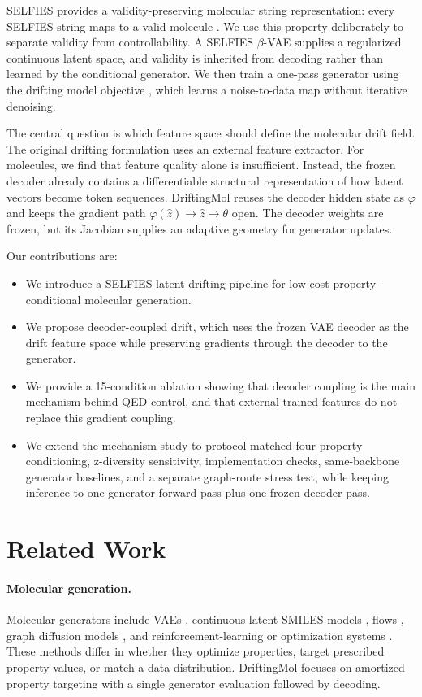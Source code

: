 \documentclass[letterpaper]{article}
\begin{document}
SELFIES provides a validity-preserving molecular string representation: every
SELFIES string maps to a valid molecule
\cite{krenn2020selfies,krenn2022selfies}. We use this property deliberately to
separate validity from controllability. A SELFIES $\beta$-VAE supplies a
regularized continuous latent space, and validity is inherited from decoding
rather than learned by the conditional generator. We then train a one-pass
generator using the drifting model objective \cite{deng2026drifting}, which
learns a noise-to-data map without iterative denoising.

The central question is which feature space should define the molecular drift
field. The original drifting formulation uses an external feature extractor.
For molecules, we find that feature quality alone is insufficient. Instead, the
frozen decoder already contains a differentiable structural representation of
how latent vectors become token sequences. DriftingMol reuses the decoder
hidden state as $\varphi$ and keeps the gradient path
$\varphi(\hat{z}) \to \hat{z} \to \theta$ open. The decoder weights are frozen,
but its Jacobian supplies an adaptive geometry for generator updates.

Our contributions are:
\begin{itemize}
    \item We introduce a SELFIES latent drifting pipeline for low-cost
    property-conditional molecular generation.
    \item We propose decoder-coupled drift, which uses the frozen VAE decoder as
    the drift feature space while preserving gradients through the decoder to
    the generator.
    \item We provide a 15-condition ablation showing that decoder coupling is the
    main mechanism behind QED control, and that external trained features do
    not replace this gradient coupling.
    \item We extend the mechanism study to protocol-matched four-property conditioning,
    z-diversity sensitivity, implementation checks, same-backbone generator
    baselines, and a separate graph-route stress test, while keeping inference
    to one generator forward pass plus one frozen decoder pass.
\end{itemize}

\section{Related Work}

\paragraph{Molecular generation.}
Molecular generators include VAEs \cite{jtvae,graphvae}, continuous-latent
SMILES models \cite{gomez2018automatic}, flows \cite{moflow,graphnvp}, graph
diffusion models \cite{digress,gdss}, and reinforcement-learning or
optimization systems
\cite{olivecrona2017molecular,zhou2019optimization,eckmann2022limo,
yang2021freed,lee2023mood}. These methods differ in whether they optimize
properties, target prescribed property values, or match a data distribution.
DriftingMol focuses on amortized property targeting with a single generator
evaluation followed by decoding.
\end{document}
